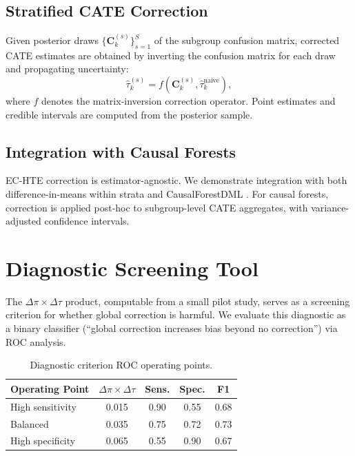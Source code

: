\documentclass[11pt,a4paper]{article}
\begin{document}
\subsection{Stratified CATE Correction}

Given posterior draws $\{\mathbf{C}_k^{(s)}\}_{s=1}^S$ of the subgroup confusion matrix, corrected CATE estimates are obtained by inverting the confusion matrix for each draw and propagating uncertainty:
\begin{equation}
\hat{\tau}_k^{(s)} = f(\mathbf{C}_k^{(s)}, \hat{\tau}_k^{\text{naive}}),
\end{equation}
where $f$ denotes the matrix-inversion correction operator.
Point estimates and credible intervals are computed from the posterior sample.

\subsection{Integration with Causal Forests}

EC-HTE correction is estimator-agnostic. We demonstrate integration with both difference-in-means within strata and CausalForestDML \citep{athey2019generalized}.
For causal forests, correction is applied post-hoc to subgroup-level CATE aggregates, with variance-adjusted confidence intervals.

\section{Diagnostic Screening Tool}
\label{sec:diagnostic}

The $\Delta\pi \times \Delta\tau$ product, computable from a small pilot study, serves as a screening criterion for whether global correction is harmful.
We evaluate this diagnostic as a binary classifier (``global correction increases bias beyond no correction'') via ROC analysis.

\begin{table}[t]
\centering
\small
\caption{Diagnostic criterion ROC operating points.}
\label{tab:diagnostic_roc}
\begin{tabular}{lcccc}
\toprule
Operating Point & $\Delta\pi \times \Delta\tau$ & Sens. & Spec. & F1 \\
\midrule
High sensitivity & 0.015 & 0.90 & 0.55 & 0.68 \\
Balanced & 0.035 & 0.75 & 0.72 & 0.73 \\
High specificity & 0.065 & 0.55 & 0.90 & 0.67 \\
\bottomrule
\end{tabular}
\end{table}
\end{document}
